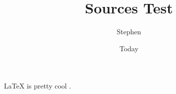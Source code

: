 \documentclass{article}
\title{Sources Test}
\author{Stephen}
\date{Today}
\begin{document}
\LaTeX{} is pretty cool \cite{mysource}.


\end{document}
